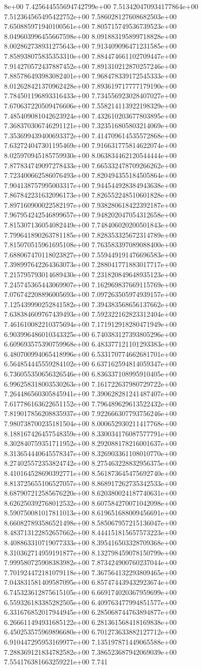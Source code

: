 8e+00	7.425644555694742799e+00	7.513420470934177864e+00	7.512364565495422752e+00	7.586028127608682503e+00	7.650885971940100561e+00	7.805715749536739523e+00	8.049603996455667598e+00	8.091883195899718828e+00	8.002862738931275643e+00	7.913409096471231585e+00	7.858938075835353310e+00	7.884474661102709447e+00	7.914270572437887452e+00	7.891310212870257246e+00	7.885786493983082401e+00	7.968478339172545333e+00	8.012628421370962428e+00	7.893619717777179190e+00	7.784501196893316433e+00	7.734556923028407027e+00	7.670637220509476606e+00	7.558214113922198329e+00	7.485409081042623924e+00	7.432610203677803895e+00	7.368370306746291121e+00	7.323516805803214069e+00	7.353699439400693372e+00	7.414709614535572868e+00	7.632724047301195469e+00	7.916631775814622074e+00	8.025970945185759930e+00	8.063834462120544444e+00	7.877834749097278433e+00	7.665332478709266262e+00	7.723400662586076493e+00	7.820494355184505864e+00	7.904138757995003317e+00	7.944544928384943638e+00	7.867842231632096173e+00	7.826552248510601828e+00	7.897160900022582197e+00	7.938280618422392187e+00	7.967954242546899657e+00	7.948202047054312658e+00	7.815307136054082449e+00	7.748406020200501843e+00	7.799641890263781185e+00	7.828353325672314789e+00	7.815070515961695108e+00	7.763583397089088400e+00	7.688067470118023827e+00	7.559449191476696583e+00	7.398997642264363073e+00	7.288041771883017717e+00	7.215795793014689430e+00	7.231820849648935123e+00	7.245745365443069907e+00	7.162969837669115769e+00	7.076742208896005693e+00	7.097263505974939157e+00	7.125439990252841582e+00	7.394383568656137662e+00	7.638384609767439493e+00	7.592322162823312404e+00	7.461610082210375694e+00	7.171912918280471949e+00	6.903996486010343325e+00	6.740383127393805296e+00	6.609693575390759968e+00	6.483377121101293383e+00	6.480700994065418996e+00	6.533170774662681701e+00	6.564854445559284102e+00	6.637162594814059347e+00	6.736055350656326546e+00	6.836337108995910405e+00	6.996258318003530263e+00	7.161722637980729722e+00	7.264486560305845941e+00	7.390628281241487407e+00	7.617786163622651152e+00	7.796489629613522432e+00	7.819017856208835937e+00	7.922666307793756246e+00	7.980738700235181504e+00	8.000652930211417768e+00	8.188167426457548359e+00	8.330034176087577791e+00	8.302840759351711952e+00	8.292088178216001637e+00	8.313654440645578347e+00	8.326903361108010770e+00	8.274025572353824742e+00	8.275463228832956375e+00	8.410164528690392771e+00	8.561873645475692740e+00	8.813725655106527057e+00	8.868917262735342533e+00	8.687907212585676220e+00	8.620380024187740631e+00	8.626250392768012532e+00	8.607584270071042098e+00	8.590750081017811013e+00	8.619651688009456691e+00	8.660827893586521498e+00	8.585067957215136047e+00	8.483713122852657662e+00	8.444151815657573223e+00	8.408863310719077333e+00	8.395416503328709368e+00	8.310362714959191877e+00	8.132798459078150799e+00	7.999580725908383982e+00	7.873424900760237044e+00	7.701924472181079118e+00	7.367564132293809465e+00	7.043831581409587095e+00	6.857474439432923674e+00	6.745323612875615105e+00	6.669174020367959699e+00	6.559326183385282505e+00	6.409763477994851577e+00	6.331676852017944945e+00	6.285068744763894877e+00	6.266611494931685122e+00	6.281361568418169838e+00	6.450253575969896680e+00	6.701273633882127712e+00	6.910447295953169977e+00	7.135197871449065588e+00	7.288369121834782582e+00	7.386523687942069039e+00	7.554176381663259221e+00	7.741